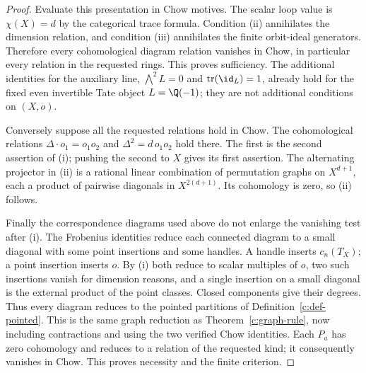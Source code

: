 \begin{proof}
Evaluate this presentation in Chow motives.  The scalar loop value
is $\chi(X)=d$ by the categorical trace formula.  Condition (ii)
annihilates the dimension relation, and condition (iii) annihilates
the finite orbit-ideal generators.  Therefore every cohomological
diagram relation vanishes in Chow, in particular every relation in
the requested rings.  This proves sufficiency.
The additional identities for the auxiliary line,
$\bigwedge^2 L=0$ and $\operatorname{tr}(\id_L)=1$, already hold
for the fixed even invertible Tate object $L=\Q(-1)$; they are
not additional conditions on $(X,o)$.

Conversely suppose all the requested relations hold in Chow.
The cohomological relations
$\Delta\cdot o_1=o_1o_2$ and
$\Delta^2=d\,o_1o_2$ hold there.  The first is the second assertion
of (i); pushing the second to $X$ gives its first assertion.
The alternating projector in (ii) is a rational linear combination
of permutation graphs on $X^{d+1}$, each a product of pairwise
diagonals in $X^{2(d+1)}$.  Its cohomology is zero, so (ii) follows.

Finally the correspondence diagrams used above do not enlarge the
vanishing test after (i).  The Frobenius identities reduce each
connected diagram to a small diagonal with some point insertions
and some handles.  A handle inserts $c_n(T_X)$; a point insertion
inserts $o$.  By (i) both reduce to scalar multiples of $o$, two
such insertions vanish for dimension reasons, and a single insertion
on a small diagonal is the external product of the point classes.
Closed components give their degrees.  Thus every diagram reduces
to the pointed partitions of Definition~\ref{c:def-pointed}.
This is the same graph reduction as Theorem~\ref{c:graph-rule},
now including contractions and using the two verified Chow
identities.  Each $P_a$ has zero cohomology and reduces to a relation
of the requested kind; it consequently vanishes in Chow.  This
proves necessity and the finite criterion.
\end{proof}

